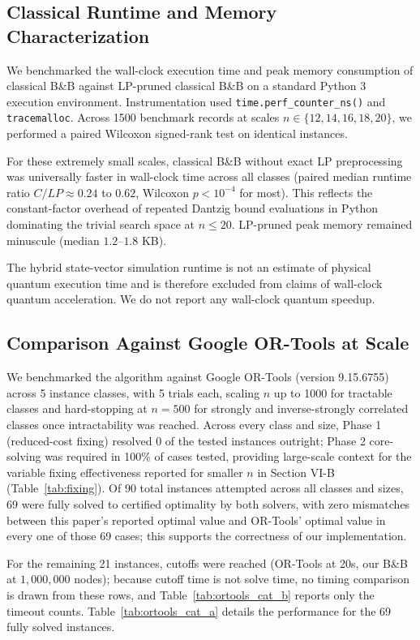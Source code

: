 \documentclass[conference]{IEEEtran} \IEEEoverridecommandlockouts
\begin{document}
\subsection{Classical Runtime and Memory Characterization}
We benchmarked the wall-clock execution time and peak memory consumption of classical B\&B against LP-pruned classical B\&B on a standard Python 3 execution environment. Instrumentation used \texttt{time.perf\_counter\_ns()} and \texttt{tracemalloc}. Across 1500 benchmark records at scales $n \in \{12, 14, 16, 18, 20\}$, we performed a paired Wilcoxon signed-rank test on identical instances. 

For these extremely small scales, classical B\&B without exact LP preprocessing was universally faster in wall-clock time across all classes (paired median runtime ratio $C/LP \approx 0.24$ to $0.62$, Wilcoxon $p < 10^{-4}$ for most). This reflects the constant-factor overhead of repeated Dantzig bound evaluations in Python dominating the trivial search space at $n \le 20$. LP-pruned peak memory remained minuscule (median $1.2\text{--}1.8$ KB). 

The hybrid state-vector simulation runtime is not an estimate of physical quantum execution time and is therefore excluded from claims of wall-clock quantum acceleration. We do not report any wall-clock quantum speedup.

\subsection{Comparison Against Google OR-Tools at Scale}

We benchmarked the algorithm against Google OR-Tools (version 9.15.6755) across 5 instance classes, with 5 trials each, scaling $n$ up to 1000 for tractable classes and hard-stopping at $n=500$ for strongly and inverse-strongly correlated classes once intractability was reached. Across every class and size, Phase 1 (reduced-cost fixing) resolved 0 of the tested instances outright; Phase 2 core-solving was required in 100\% of cases tested, providing large-scale context for the variable fixing effectiveness reported for smaller $n$ in Section VI-B (Table~\ref{tab:fixing}). Of 90 total instances attempted across all classes and sizes, 69 were fully solved to certified optimality by both solvers, with zero mismatches between this paper's reported optimal value and OR-Tools' optimal value in every one of those 69 cases; this supports the correctness of our implementation. 

For the remaining 21 instances, cutoffs were reached (OR-Tools at 20s, our B\&B at $1{,}000{,}000$ nodes); because cutoff time is not solve time, no timing comparison is drawn from these rows, and Table~\ref{tab:ortools_cat_b} reports only the timeout counts. Table~\ref{tab:ortools_cat_a} details the performance for the 69 fully solved instances.
\end{document}

